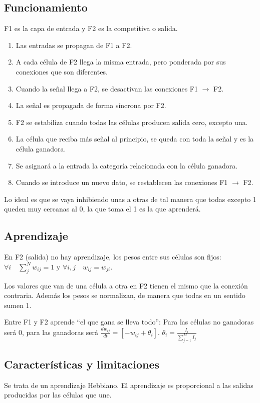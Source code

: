 \documentclass[12pt, twoside, openright]{report} %
\begin{document}
\subsection{Funcionamiento}
F1 es la capa de entrada y F2 es la competitiva o salida.
\begin{enumerate}
	\item Las entradas se propagan de F1 a F2.
	\item A cada célula de F2 llega la misma entrada, pero ponderada por sus conexiones que son diferentes.
	\item Cuando la señal llega a F2, se desactivan las conexiones F1 $\rightarrow$ F2.
	\item La señal es propagada de forma síncrona por F2.
	\item F2 se estabiliza cuando todas las células producen salida cero, excepto una.
	\item La célula que reciba más señal al principio, se queda con toda la señal y es la célula ganadora.
	\item Se asignará a la entrada la categoría relacionada con la célula ganadora.
	\item Cuando se introduce un nuevo dato, se restablecen las conexiones F1 $\rightarrow$ F2.
\end{enumerate}

Lo ideal es que se vaya inhibiendo unas a otras de tal manera que todas excepto 1 queden muy cercanas al 0, la que toma el 1 es la que aprenderá.

\subsection{Aprendizaje}
En F2 (salida) no hay aprendizaje, los pesos entre sus células son fijos: $\forall i \quad \sum^N_j w_{ij}=1$ y $\forall i, j \quad w_{ij}=w_{ji}$.

Los valores que van de una célula a otra en F2 tienen el mismo que la conexión contraria. Además los pesos se normalizan, de manera que todas en un sentido sumen 1.

Entre F1 y F2 aprende “el que gana se lleva todo”: Para las células no ganadoras será 0, para las ganadoras será $\frac{dw_{ij}}{dt}=[-w_{ij}+\theta_i]$. $\theta_i=\frac{I_i}{\sum_{j=1}^M I_j}$

\subsection{Características y limitaciones}
Se trata de un aprendizaje Hebbiano. El aprendizaje es proporcional a las salidas producidas por las células que une.
\end{document}
